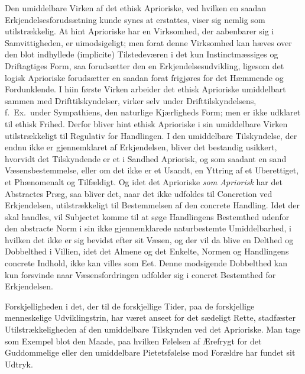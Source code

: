 Den umiddelbare Virken af det ethisk Aprioriske, ved hvilken en saadan
Erkjendelsesforudsætning kunde synes at erstattes, viser sig nemlig som
utilstrækkelig. At hint Aprioriske har en Virksomhed, der aabenbarer sig i
Samvittigheden, er uimodsigeligt; men forat denne Virksomhed kan hæves over den
blot indhyllede (implicite) Tilstedeværen i det kun Instinctmæssiges og
Driftagtiges Form, saa forudsætter den en Erkjendelsesudvikling, ligesom det
logisk Aprioriske forudsætter en saadan forat frigjøres for det Hæmmende og
Fordunklende. I hiin første Virken arbeider det ethisk Aprioriske umiddelbart
sammen med Drifttilskyndelser, virker selv under Drifttilskyndelsens,
f.\ Ex.\ under Sympathiens, den naturlige Kjærligheds Form; men er ikke udklaret til
ethisk Frihed. Derfor bliver hint ethisk Aprioriske i sin umiddelbare Virken
utilstrækkeligt til Regulativ for Handlingen. I den umiddelbare Tilskyndelse,
der endnu ikke er gjennemklaret af Erkjendelsen, bliver det bestandig usikkert,
hvorvidt det Tilskyndende er et i Sandhed Apriorisk, og som saadant en sand
Væsensbestemmelse, eller om det ikke er et Usandt, en Yttring af et Uberettiget,
et Phænomenalt og Tilfældigt. Og idet det Aprioriske \emph{som Apriorisk} har
det Abstractes Præg, saa bliver det, naar det ikke udfoldes til Concretion ved
Erkjendelsen, utilstrækkeligt til Bestemmelsen af den concrete Handling. Idet
der skal handles, vil Subjectet komme til at søge Handlingens Bestemthed
udenfor den abstracte Norm i sin ikke gjennemklarede naturbestemte
Umiddelbarhed, i hvilken det ikke er sig bevidst efter sit Væsen, og der vil da
blive en Delthed og Dobbelthed i Villien, idet det Almene og det Enkelte, Normen
og Handlingens concrete Indhold, ikke kan villes som Eet. Denne modsigende
Dobbelthed kan kun forsvinde naar Væsensfordringen udfolder sig i concret
Bestemthed for Erkjendelsen.

Forskjelligheden i det, der til de forskjellige Tider, paa de forskjellige
menneskelige Udviklingstrin, har været anseet
 for det sædeligt Rette, stadfæster Utilstrækkeligheden af den umiddelbare
Tilskynden ved det Aprioriske. Man tage som Exempel blot den Maade, paa hvilken
Følelsen af Ærefrygt for det Guddommelige eller den umiddelbare Pietetsfølelse
mod Forældre har fundet sit Udtryk.


